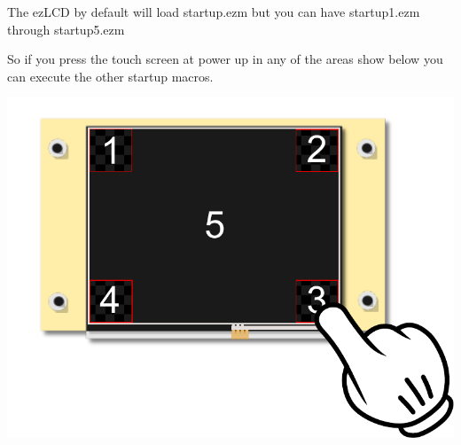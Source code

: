 The ez\-L\-C\-D by default will load startup.\-ezm but you can have startup1.\-ezm through startup5.\-ezm \par
 So if you press the touch screen at power up in any of the areas show below you can execute the other startup macros.\par
 

 
\begin{DoxyImageNoCaption}
  \mbox{\includegraphics{startupZones}}
\end{DoxyImageNoCaption}
 